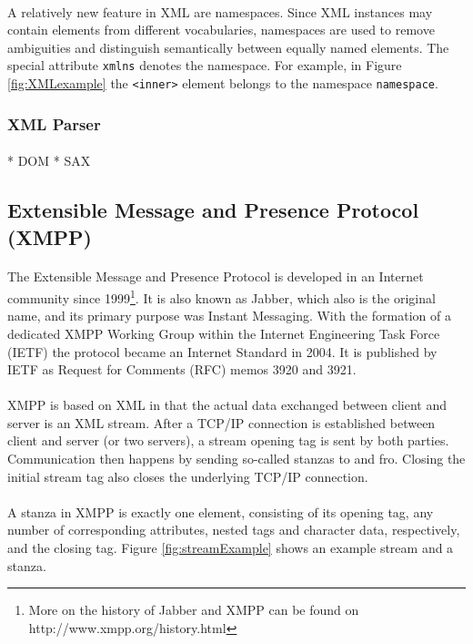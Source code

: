 \paragraph{}
A relatively new feature in XML are namespaces. Since XML instances may contain elements from different vocabularies, namespaces are used to remove ambiguities and distinguish semantically between equally named elements. The special attribute \texttt{xmlns} denotes the namespace. For example, in Figure \ref{fig:XMLexample} the \texttt{<inner>} element belongs to the namespace \texttt{namespace}.

\subsubsection{XML Parser}
\paragraph{}
* DOM
* SAX


\subsection{Extensible Message and Presence Protocol (XMPP)}
\label{sec:xmpp}
\paragraph{}
The Extensible Message and Presence Protocol is developed in an Internet community since 1999\footnote{More on the history of Jabber and XMPP can be found on http://www.xmpp.org/history.html}. It is also known as Jabber, which also is the original name, and its primary purpose was Instant Messaging. With the formation of a dedicated XMPP Working Group within the Internet Engineering Task Force (IETF) the protocol became an Internet Standard in 2004. It is published by IETF as Request for Comments (RFC) memos 3920 and 3921.
\paragraph{}
XMPP is based on XML in that the actual data exchanged between client and server is an XML stream. After a TCP/IP connection is established between client and server (or two servers), a stream opening tag is sent by both parties. Communication then happens by sending so-called stanzas to and fro. Closing the initial stream tag also closes the underlying TCP/IP connection.
\paragraph{}
A stanza in XMPP is exactly one element, consisting of its opening tag, any number of corresponding attributes, nested tags and character data, respectively, and the closing tag. Figure \ref{fig:streamExample} shows an example stream and a stanza.

